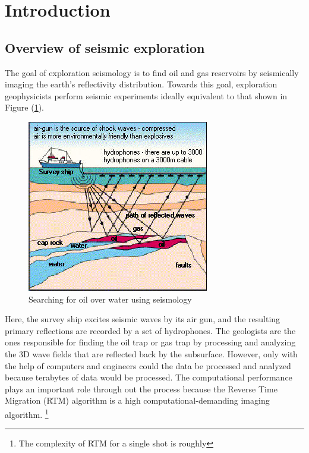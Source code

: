\section{Introduction}

\subsection{Overview of seismic exploration}
The goal of exploration seismology is to find oil and gas reservoirs
by seismically imaging the earth's reflectivity distribution. Towards
this goal, exploration geophysicists perform seismic experiments ideally
equivalent to that shown in Figure (\ref{fig:oil-drilling}).

\begin{figure}[h]
\centering
\includegraphics[scale=0.65]{img/oil-drilling-prospecting2.jpg}
\caption{Searching for oil over water using seismology}
\label{fig:oil-drilling}
\end{figure}

Here,
the survey ship excites seismic waves by its air gun, and the resulting
primary reflections are recorded by a set of hydrophones. The geologists
are the ones responsible for finding the oil trap or gas trap by processing
and analyzing the 3D wave fields that are reflected back by the subsurface.
However, only with the help of computers and engineers could the data
be processed and analyzed because terabytes of data would be processed.
The computational performance plays an important role through out
the process because the Reverse Time Migration (RTM) algorithm is
a high computational-demanding imaging algorithm.%
\footnote{The complexity of RTM for a single shot is roughly %
}


